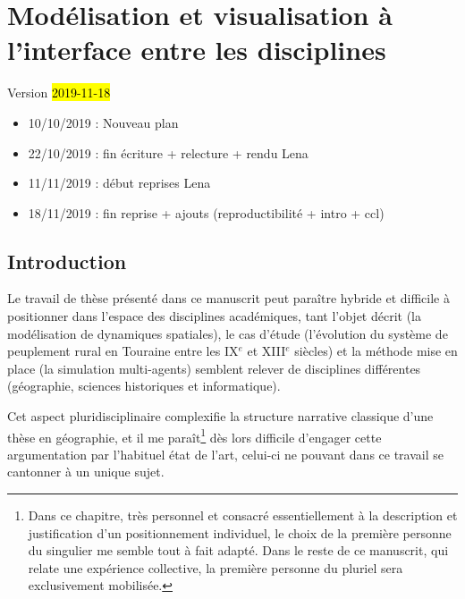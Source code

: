 \setcounter{chapter}{0}
\graphicspath{{chap1/}}


\chapter{Modélisation et visualisation à l'interface entre les disciplines}
\label{chap:chap1}
\begin{center}
	{\large Version \hl{2019-11-18}}
\end{center}

\begin{itemize}
	\item 10/10/2019 : Nouveau plan
	\item 22/10/2019 : fin écriture + relecture + rendu Lena
	\item 11/11/2019 : début reprises Lena
	\item 18/11/2019 : fin reprise + ajouts (reproductibilité + intro + ccl)
\end{itemize} 
\setcounter{minitocdepth}{2}
\minitoc
\clearpage
{}

\section*{Introduction}

Le travail de thèse présenté dans ce manuscrit peut paraître hybride et difficile à positionner dans l'espace des disciplines académiques, tant l'objet décrit (la modélisation de dynamiques spatiales), le cas d'étude (l'évolution du système de peuplement rural en Touraine entre les IX$^e$ et XIII$^e$ siècles) et la méthode mise en place (la simulation multi-agents) semblent relever de disciplines différentes (géographie, sciences historiques et informatique).

Cet aspect pluridisciplinaire complexifie la structure narrative classique d'une thèse en géographie, et il me paraît\footnote{
	Dans ce chapitre, très personnel et consacré essentiellement à la description et justification d'un positionnement individuel, le choix de la première personne du singulier me semble tout à fait adapté.
	Dans le reste de ce manuscrit, qui relate une expérience collective, la première personne du pluriel sera exclusivement mobilisée.
} dès lors difficile d'engager cette argumentation par l'habituel état de l'art, celui-ci ne pouvant dans ce travail se cantonner à un unique sujet.

